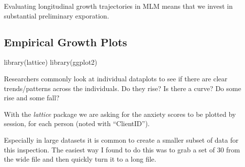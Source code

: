 \documentclass[
  english,
]{book}
\newenvironment{Shaded}{\begin{snugshade}}{\end{snugshade}}
\newcommand{\FunctionTok}[1]{\textcolor[rgb]{0.00,0.00,0.00}{#1}}
\newcommand{\NormalTok}[1]{#1}
\begin{document}
Evaluating longitudinal growth trajectories in MLM means that we invest in substantial preliminary exporation.

\hypertarget{empirical-growth-plots}{%
\subsection{Empirical Growth Plots}\label{empirical-growth-plots}}

\begin{Shaded}
\begin{Highlighting}[]
\FunctionTok{library}\NormalTok{(lattice)}
\FunctionTok{library}\NormalTok{(ggplot2)}
\end{Highlighting}
\end{Shaded}

Researchers commonly look at individual dataplots to see if there are clear trends/patterns across the individuals. Do they rise? Is there a curve? Do some rise and some fall?

With the \emph{lattice} package we are asking for the anxiety scores to be plotted by session, for each person (noted with ``ClientID'').

Especially in large datasets it is common to create a smaller subset of data for this inspection. The easiest way I found to do this was to grab a set of 30 from the wide file and then quickly turn it to a long file.
\end{document}
